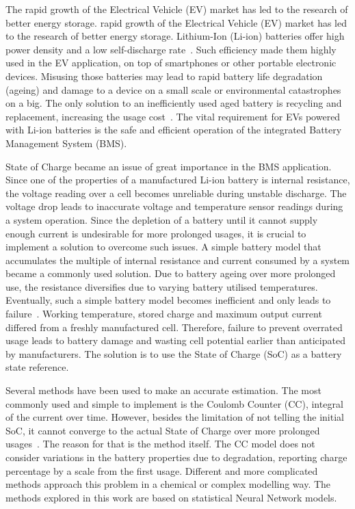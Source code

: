 %
{
    The rapid growth of the Electrical Vehicle (EV) market has led to the research of better energy storage.
} {
     rapid growth of the Electrical Vehicle (EV) market has led to the research of better energy storage.
}
Lithium-Ion (Li-ion) batteries offer high power density and a low self-discharge rate~\cite{han_review, en13082106}.
Such efficiency made them highly used in the EV application, on top of smartphones or other portable electronic devices.
Misusing those batteries may lead to rapid battery life degradation (ageing) and damage to a device on a small scale or environmental catastrophes on a big.
The only solution to an inefficiently used aged battery is recycling and replacement, increasing the usage cost~\cite{skeete_beyond_2020}.
The vital requirement for EVs powered with Li-ion batteries is the safe and efficient operation of the integrated Battery Management System (BMS).

%
State of Charge became an issue of great importance in the BMS application.
Since one of the properties of a manufactured Li-ion battery is internal resistance, the voltage reading over a cell becomes unreliable during unstable discharge.
The voltage drop leads to inaccurate voltage and temperature sensor readings during a system operation.
Since the depletion of a battery until it cannot supply enough current is undesirable for more prolonged usages, it is crucial to implement a solution to overcome such issues.
A simple battery model that accumulates the multiple of internal resistance and current consumed by a system became a commonly used solution.
Due to battery ageing over more prolonged use, the resistance diversifies due to varying battery utilised temperatures.
Eventually, such a simple battery model becomes inefficient and only leads to failure~\cite{fenrg.2019.00065}.
Working temperature, stored charge and maximum output current differed from a freshly manufactured cell.
Therefore, failure to prevent overrated usage leads to battery damage and wasting cell potential earlier than anticipated by manufacturers.
The solution is to use the State of Charge (SoC) as a battery state reference.

%
Several methods have been used to make an accurate estimation.
The most commonly used and simple to implement is the Coulomb Counter (CC), integral of the current over time.
However, besides the limitation of not telling the initial SoC, it cannot converge to the actual State of Charge over more prolonged usages~\cite{ng_enhanced_2009}.
The reason for that is the method itself.
The CC model does not consider variations in the battery properties due to degradation, reporting charge percentage by a scale from the first usage.
Different and more complicated methods approach this problem in a chemical or complex modelling way.
The methods explored in this work are based on statistical Neural Network models.

